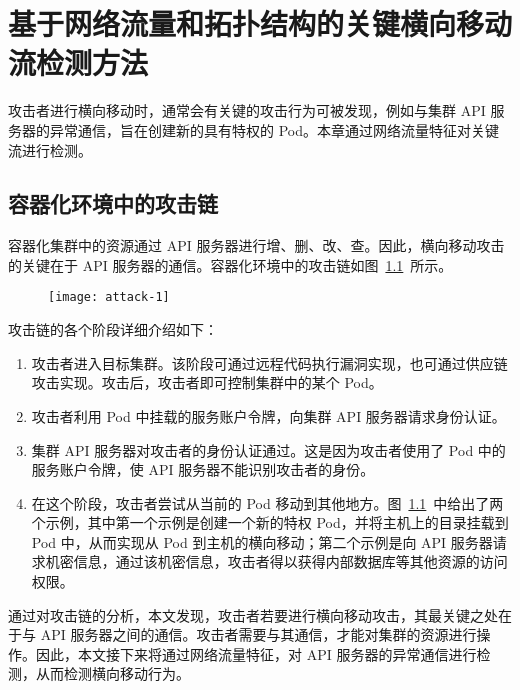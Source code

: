 \chapter{基于网络流量和拓扑结构的关键横向移动流检测方法}{
{
\let\cleardoublepage\relax
}

攻击者进行横向移动时，通常会有关键的攻击行为可被发现，例如与集群 API 服务器的异常通信，旨在创建新的具有特权的 Pod。本章通过网络流量特征对关键流进行检测。

\section{容器化环境中的攻击链}

容器化集群中的资源通过 API 服务器进行增、删、改、查。因此，横向移动攻击的关键在于 API 服务器的通信。容器化环境中的攻击链\citep{armo2024}如图~\ref{fig:attack-1}~所示。

\begin{figure}[!htbp]
    \centering
    \texttt{[image: attack-1]}
    \label{fig:attack-1}

\end{figure}

攻击链的各个阶段详细介绍如下：

\begin{enumerate}
    \item 攻击者进入目标集群。该阶段可通过远程代码执行漏洞实现，也可通过供应链攻击实现。攻击后，攻击者即可控制集群中的某个 Pod。
    \item 攻击者利用 Pod 中挂载的服务账户令牌，向集群 API 服务器请求身份认证。
    \item 集群 API 服务器对攻击者的身份认证通过。这是因为攻击者使用了 Pod 中的服务账户令牌，使 API 服务器不能识别攻击者的身份。
    \item 在这个阶段，攻击者尝试从当前的 Pod 移动到其他地方。图~\ref{fig:attack-1}~中给出了两个示例，其中第一个示例是创建一个新的特权 Pod，并将主机上的目录挂载到 Pod 中，从而实现从 Pod 到主机的横向移动；第二个示例是向 API 服务器请求机密信息，通过该机密信息，攻击者得以获得内部数据库等其他资源的访问权限。
\end{enumerate}

通过对攻击链的分析，本文发现，攻击者若要进行横向移动攻击，其最关键之处在于与 API 服务器之间的通信。攻击者需要与其通信，才能对集群的资源进行操作。因此，本文接下来将通过网络流量特征，对 API 服务器的异常通信进行检测，从而检测横向移动行为。

}
